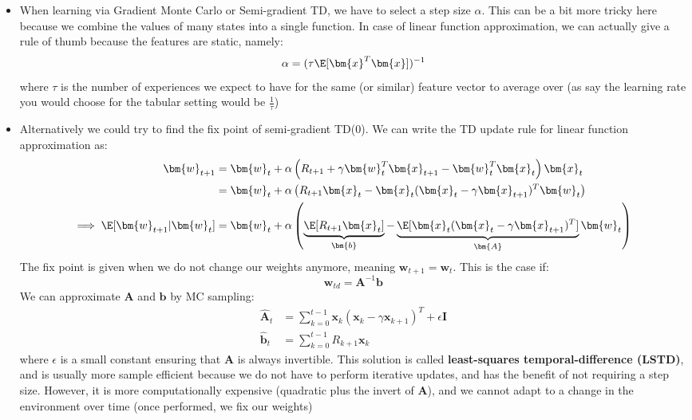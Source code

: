 \begin{itemize}
	\item When learning via Gradient Monte Carlo or Semi-gradient TD, we have to select a step size $\alpha$. This can be a bit more tricky here because we combine the values of many states into a single function. In case of linear function approximation, we can actually give a rule of thumb because the features are static, namely:
	$$\alpha = (\tau\E[\bm{x}^T\bm{x}])^{-1}$$
	where $\tau$ is the number of experiences we expect to have for the same (or similar) feature vector to average over (as say the learning rate you would choose for the tabular setting would be $\frac{1}{\tau}$)
	\item Alternatively we could try to find the fix point of semi-gradient TD(0). We can write the TD update rule for linear function approximation as:
	\begin{equation*}
		\begin{split}
			\bm{w}_{t+1} & = \bm{w}_t + \alpha \left(R_{t+1}+\gamma \bm{w}_t^T \bm{x}_{t+1} - \bm{w}_t^T\bm{x}_t\right)\bm{x}_t\\
			& = \bm{w}_t + \alpha \left(R_{t+1}\bm{x}_t - \bm{x}_t (\bm{x}_t - \gamma \bm{x}_{t+1})^T \bm{w}_t\right)\\
			\implies \E[\bm{w}_{t+1}|\bm{w}_t] & = \bm{w}_t + \alpha \left(\underbrace{\E[R_{t+1}\bm{x}_t]}_{\bm{b}} - \underbrace{\E[\bm{x}_t (\bm{x}_t - \gamma \bm{x}_{t+1})^T]}_{\bm{A}} \bm{w}_t\right)\\
		\end{split}
	\end{equation*}
	The fix point is given when we do not change our weights anymore, meaning $\bm{w}_{t+1}=\bm{w}_t$. This is the case if:
	$$\bm{w}_{td}=\bm{A}^{-1}\bm{b}$$
	We can approximate $\bm{A}$ and $\bm{b}$ by MC sampling:
	\begin{equation*}
		\begin{split}
			\hat{\bm{A}}_t & = \sum_{k=0}^{t-1}\bm{x}_k\left(\bm{x}_k - \gamma\bm{x}_{k+1}\right)^T + \epsilon\bm{I}\\
			\hat{\bm{b}}_t & = \sum_{k=0}^{t-1}R_{k+1}\bm{x}_k
		\end{split}
	\end{equation*}
	where $\epsilon$ is a small constant ensuring that $\bm{\hat{A}}$ is always invertible. This solution is called \textbf{least-squares temporal-difference (LSTD)}, and is usually more sample efficient because we do not have to perform iterative updates, and has the benefit of not requiring a step size. However, it is more computationally expensive (quadratic plus the invert of $\bm{A}$), and we cannot adapt to a change in the environment over time (once performed, we fix our weights)
\end{itemize}
